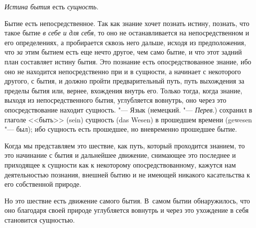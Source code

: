 \clearpage
{\em Истина бытия} есть {\em сущность}.

Бытие есть непосредственное. Так как знание хочет познать истину, познать,
что такое бытие {\em в себе и для себя}, то оно не
останавливается на непосредственном и его определениях, а пробирается
сквозь него дальше, исходя из предположения, что
{\em за} этим бытием есть еще нечто другое, чем само
бытие, и что этот задний план составляет истину бытия. Это познание есть
опосредствованное знание, ибо оно не находится непосредственно при и в
сущности, а начинает с некоторого другого, с бытия, и должно пройти
предварительный путь, путь выхождения за пределы бытия или, вернее,
вхождения внутрь его. Только тогда, когда знание, выходя из
непосредственного бытия, углубляется вовнутрь, оно через это
опосредствование находит сущность. "--- Язык (немецкий. "--- {\em Перев}.)
сохранил в глаголе <<быть>> (sein) сущность (das Wesen) в прошедшем времени
(gewesen "--- был); ибо сущность есть прошедшее, но вневременно прошедшее
бытие.

Когда мы представляем это шествие, как путь, который проходится знанием, то
это начинание с бытия и дальнейшее движение, снимающее это последнее и
приходящее к сущности как к некоторому опосредствованному, кажутся нам
деятельностью познания, внешней бытию и не имеющей никакого касательства к
его собственной природе.

Но это шествие есть движение самого бытия. В~самом бытии обнаружилось, что
оно благодаря своей природе углубляется вовнутрь и через это ухождение в
себя становится сущностью.

